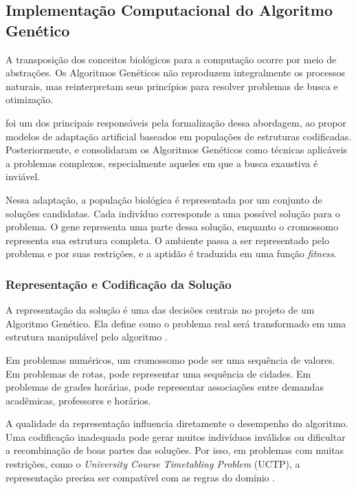 \subsection{Implementação Computacional do Algoritmo Genético}
\label{subsec:implementacao-computacional-ag}

A transposição dos conceitos biológicos para a computação ocorre por meio de abstrações. Os Algoritmos Genéticos não reproduzem integralmente os processos naturais, mas reinterpretam seus princípios para resolver problemas de busca e otimização.

 foi um dos principais responsáveis pela formalização dessa abordagem, ao propor modelos de adaptação artificial baseados em populações de estruturas codificadas. Posteriormente,  e  consolidaram os Algoritmos Genéticos como técnicas aplicáveis a problemas complexos, especialmente aqueles em que a busca exaustiva é inviável.

Nessa adaptação, a população biológica é representada por um conjunto de soluções candidatas. Cada indivíduo corresponde a uma possível solução para o problema. O gene representa uma parte dessa solução, enquanto o cromossomo representa sua estrutura completa. O ambiente passa a ser representado pelo problema e por suas restrições, e a aptidão é traduzida em uma função \textit{fitness}.

\subsubsection{Representação e Codificação da Solução}
\label{subsubsec:representacao-codificacao-solucao}

A representação da solução é uma das decisões centrais no projeto de um Algoritmo Genético. Ela define como o problema real será transformado em uma estrutura manipulável pelo algoritmo \cite{eiben2015}.

Em problemas numéricos, um cromossomo pode ser uma sequência de valores. Em problemas de rotas, pode representar uma sequência de cidades. Em problemas de grades horárias, pode representar associações entre demandas acadêmicas, professores e horários.

A qualidade da representação influencia diretamente o desempenho do algoritmo. Uma codificação inadequada pode gerar muitos indivíduos inválidos ou dificultar a recombinação de boas partes das soluções. Por isso, em problemas com muitas restrições, como o \textit{University Course Timetabling Problem} (UCTP), a representação precisa ser compatível com as regras do domínio \cite{abdipoor2023}.

